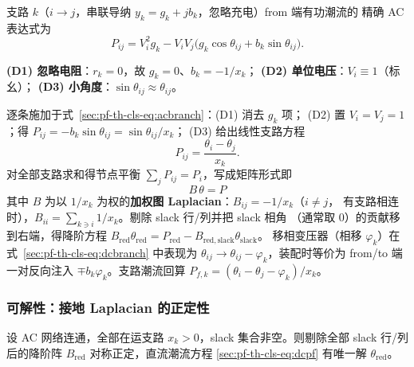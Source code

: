 支路 $k$（$i\!\to\!j$，串联导纳 $y_k=g_k+jb_k$，忽略充电）from 端有功潮流的
精确 AC 表达式为
\begin{equation}
P_{ij}=V_i^2 g_k-V_iV_j\bigl(g_k\cos\theta_{ij}+b_k\sin\theta_{ij}\bigr).
\label{sec:pf-th-cls-eq:acbranch}
\end{equation}

\begin{definition}[直流潮流三条假设]\label{sec:pf-th-cls-def-dc}
\textbf{(D1) 忽略电阻}：$r_k=0$，故 $g_k=0$、$b_k=-1/x_k$；
\textbf{(D2) 单位电压}：$V_i\equiv1$（标幺）；
\textbf{(D3) 小角度}：$\sin\theta_{ij}\approx\theta_{ij}$。
\end{definition}

逐条施加于式~\eqref{sec:pf-th-cls-eq:acbranch}：(D1) 消去 $g_k$ 项；
(D2) 置 $V_i=V_j=1$；得 $P_{ij}=-b_k\sin\theta_{ij}=\sin\theta_{ij}/x_k$；
(D3) 给出线性支路方程
\begin{equation}
P_{ij}=\frac{\theta_i-\theta_j}{x_k}.
\label{sec:pf-th-cls-eq:dcbranch}
\end{equation}
对全部支路求和得节点平衡 $\sum_j P_{ij}=P_i$，写成矩阵形式即
\begin{equation}
\boxed{\;B\,\theta=P\;}
\label{sec:pf-th-cls-eq:dcpf}
\end{equation}
其中 $B$ 为以 $1/x_k$ 为权的\textbf{加权图 Laplacian}：$B_{ij}=-1/x_k$（$i\ne j$，
有支路相连时），$B_{ii}=\sum_{k\ni i}1/x_k$。剔除 slack 行/列并把 slack 相角
（通常取 $0$）的贡献移到右端，得降阶方程
$B_{\mathrm{red}}\theta_{\mathrm{red}}=P_{\mathrm{red}}-B_{\mathrm{red,slack}}\theta_{\mathrm{slack}}$。
移相变压器（相移 $\varphi_k$）在式~\eqref{sec:pf-th-cls-eq:dcbranch} 中表现为
$\theta_{ij}\to\theta_{ij}-\varphi_k$，装配时等价为 from/to 端一对反向注入
$\mp b_k\varphi_k$。支路潮流回算
$P_{f,k}=(\theta_i-\theta_j-\varphi_k)/x_k$。

\subsubsection{可解性：接地 Laplacian 的正定性}

\begin{theorem}[降阶 $B$ 阵的对称正定性]\label{sec:pf-th-cls-thm-dc}
设 AC 网络连通，全部在运支路 $x_k>0$，slack 集合非空。则剔除全部 slack
行/列后的降阶阵 $B_{\mathrm{red}}$ 对称正定，直流潮流方程
\eqref{sec:pf-th-cls-eq:dcpf} 有唯一解 $\theta_{\mathrm{red}}$。
\end{theorem}

